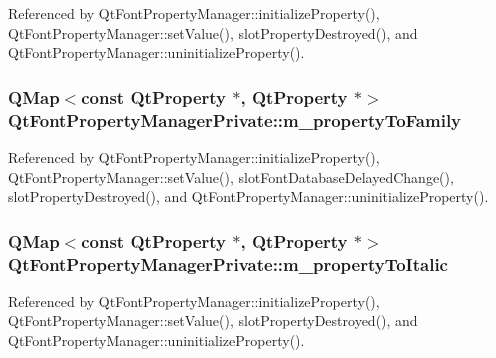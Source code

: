 Referenced by Qt\+Font\+Property\+Manager\+::initialize\+Property(), Qt\+Font\+Property\+Manager\+::set\+Value(), slot\+Property\+Destroyed(), and Qt\+Font\+Property\+Manager\+::uninitialize\+Property().

\subsubsection[{m\+\_\+property\+To\+Family}]{\setlength{\rightskip}{0pt plus 5cm}Q\+Map$<$const {\bf Qt\+Property} $\ast$, {\bf Qt\+Property} $\ast$$>$ Qt\+Font\+Property\+Manager\+Private\+::m\+\_\+property\+To\+Family}\label{classQtFontPropertyManagerPrivate_a9f13b50e4a0c518b066f78e280cc21a8}


Referenced by Qt\+Font\+Property\+Manager\+::initialize\+Property(), Qt\+Font\+Property\+Manager\+::set\+Value(), slot\+Font\+Database\+Delayed\+Change(), slot\+Property\+Destroyed(), and Qt\+Font\+Property\+Manager\+::uninitialize\+Property().

\subsubsection[{m\+\_\+property\+To\+Italic}]{\setlength{\rightskip}{0pt plus 5cm}Q\+Map$<$const {\bf Qt\+Property} $\ast$, {\bf Qt\+Property} $\ast$$>$ Qt\+Font\+Property\+Manager\+Private\+::m\+\_\+property\+To\+Italic}\label{classQtFontPropertyManagerPrivate_a8adbcc38bf88815493adc2762ae53fbd}


Referenced by Qt\+Font\+Property\+Manager\+::initialize\+Property(), Qt\+Font\+Property\+Manager\+::set\+Value(), slot\+Property\+Destroyed(), and Qt\+Font\+Property\+Manager\+::uninitialize\+Property().

